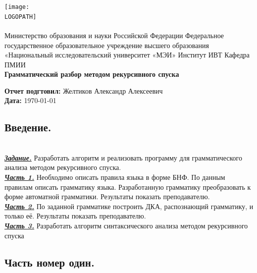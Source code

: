 \documentclass[12pt]{article}
\def \LOGOPATH {assets/logo3.png}
\def \DEPARTEMENT {Министерство образования и науки Российской Федерации 
Федеральное государственное образовательное учреждение высшего образования
\\ «Национальный исследовательский университет «МЭИ» 
Институт ИВТ
Кафедра ПМИИ
}
\def \REPORTTITLE {Грамматический разбор методом рекурсивного спуска}
\def \STUDENTNAME {Желтиков Александр Алексеевич}
\begin{document}

\begin{titlepage}
    \vfill
    \begin{center}
        \texttt{[image: \\LOGOPATH]} \\
        \hfill \\
        \Large{\DEPARTEMENT} \\
        \vfill
        \textbf{\LARGE{\REPORTTITLE}}
    \end{center}
    \vfill
    \begin{flushleft}
        \Large{\textbf{Отчет подгтовил:} \STUDENTNAME} \\
        \Large{\textbf{Дата:} \today}
    \end{flushleft}
    \vfill
\end{titlepage}

\clearpage


\begin{center}
    \chapter{\textbf{\Large{Введение.}}}    
\end{center}
\\

\underline{\textit{\textbf{Задание.}}} Разработать алгоритм и реализовать программу для грамматического анализа методом рекурсивного спуска.
\\

\underline{\textit{\textbf{Часть 1.}}} Необходимо описать правила языка в форме БНФ. По данным правилам описать грамматику языка. Разработанную грамматику преобразовать к форме автоматной грамматики. Результаты показать преподавателю.
\\

\underline{\textit{\textbf{Часть 2.}}} По заданной грамматике построить ДКА, распознающий грамматику, и только её. Результаты показать преподавателю.
\\

\underline{\textit{\textbf{Часть 3.}}} Разработать алгоритм синтаксического анализа методом рекурсивного спуска
\\

\begin{center}
    \chapter{\textbf{\Large{Часть номер один.}}}    
\end{center}
\end{document}
